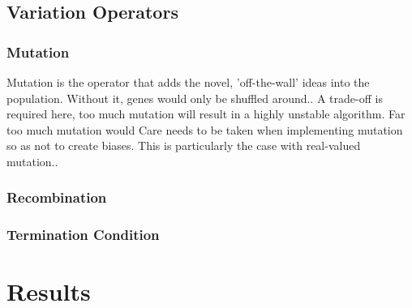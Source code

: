\documentclass{article}
\begin{document}
\cite{multi_objective_bloat}


\subsection{Variation Operators}
\subsubsection{Mutation}
Mutation is the operator that adds the novel, 'off-the-wall' ideas into the population. Without it, genes would only be shuffled around.. %
A trade-off is required here, too much mutation will result in a highly unstable algorithm. Far too much mutation would %
Care needs to be taken when implementing mutation so as not to create biases. This is particularly the case with real-valued mutation.. %

\subsubsection{Recombination}



\subsubsection{Termination Condition}

\section{Results} %

\end{document}
